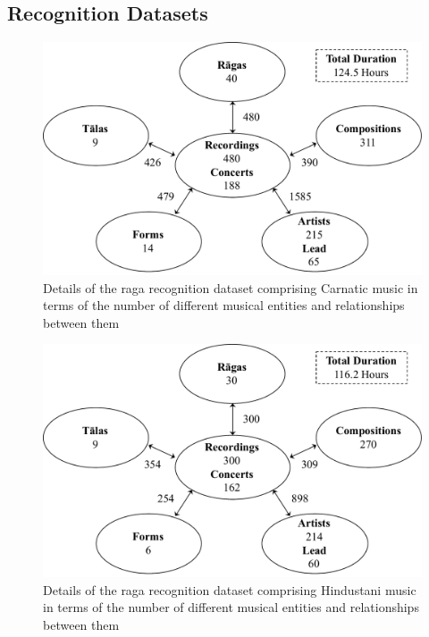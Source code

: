 {{{{\subsection{ Recognition Datasets}
\label{sec:corpus_raga_recognition_datasets}



\begin{figure}
	\begin{center}
		\includegraphics[width=\figSizeNinety]{ch04_datasets/figures/carnatic_corpus_ragaDB.pdf}
	\end{center}
	\caption[Details of the \gls{raga} recognition dataset comprising Carnatic music]{Details of the \gls{raga} recognition dataset comprising Carnatic music in terms of the number of different musical entities and relationships between them}
	\label{fig:carnatic_ragaDB_details}
\end{figure}

\begin{figure}
	\begin{center}
		\includegraphics[width=\figSizeNinety]{ch04_datasets/figures/hindustani_corpus_ragaDB.pdf}
	\end{center}
	\caption[Details of the \gls{raga} recognition dataset comprising Hindustani music]{Details of the \gls{raga} recognition dataset comprising Hindustani music in terms of the number of different musical entities and relationships between them}
	\label{fig:hindustani_cc_corpus_details}
\end{figure}

}}}}
